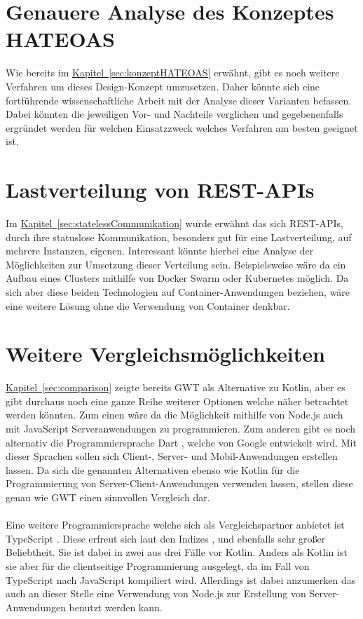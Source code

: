 \section{Genauere Analyse des Konzeptes HATEOAS}
Wie bereits im \hyperref[sec:konzeptHATEOAS]{Kapitel~\ref{sec:konzeptHATEOAS}} erwähnt, gibt es noch weitere Verfahren um dieses Design-Konzept umzusetzen. Daher könnte sich eine fortführende wissenschaftliche Arbeit mit der Analyse dieser Varianten befassen. Dabei könnten die jeweiligen Vor- und Nachteile verglichen und gegebenenfalls ergründet werden für welchen Einsatzzweck welches Verfahren am besten geeignet ist.

\section{Lastverteilung von REST-APIs}
Im \hyperref[sec:statelessCommunikation]{Kapitel~\ref{sec:statelessCommunikation}} wurde erwähnt das sich \gls{REST}-\glspl{API}, durch ihre statuslose Kommunikation, besonders gut für eine Lastverteilung, auf mehrere Instanzen, eigenen. Interessant könnte hierbei eine Analyse der Möglichkeiten zur Umsetzung dieser Verteilung sein. Beispielsweise wäre da ein Aufbau eines Clusters mithilfe von Docker Swarm oder Kubernetes möglich. Da sich aber diese beiden Technologien auf Container-Anwendungen beziehen, wäre eine weitere Lösung ohne die Verwendung von Container denkbar.

\section{Weitere Vergleichsmöglichkeiten}
\hyperref[sec:comparison]{Kapitel~\ref{sec:comparison}} zeigte bereits \gls{GWT} als Alternative zu Kotlin, aber es gibt durchaus noch eine ganze Reihe weiterer Optionen welche näher betrachtet werden könnten. Zum einen wäre da die Möglichkeit mithilfe von Node.js \cite{nodeJs} auch mit JavaScript Serveranwendungen zu programmieren. Zum anderen gibt es noch alternativ die Programmiersprache Dart \cite{dart}, welche von Google entwickelt wird. Mit dieser Sprachen sollen sich Client-, Server- und Mobil-Anwendungen erstellen lassen. Da sich die genannten Alternativen ebenso wie Kotlin für die Programmierung von Server-Client-Anwendungen verwenden lassen, stellen diese genau wie \gls{GWT} einen sinnvollen Vergleich dar.\\
\\
Eine weitere Programmiersprache welche sich als Vergleichspartner anbietet ist TypeScript \cite{typeScript}. Diese erfreut sich laut den Indizes \cite{tiobeIndex}, \cite{redMonkIndex} und \cite{pyplIndex} ebenfalls sehr großer Beliebtheit. Sie ist dabei in zwei aus drei Fälle vor Kotlin. Anders als Kotlin ist sie aber für die clientseitige Programmierung ausgelegt, da im Fall von TypeScript nach JavaScript kompiliert wird. Allerdings ist dabei anzumerken das auch an dieser Stelle eine Verwendung von Node.js zur Erstellung von Server-Anwendungen benutzt werden kann.